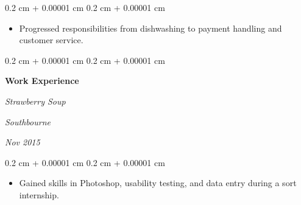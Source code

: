 \documentclass[10pt, letterpaper]{article}
\newenvironment{highlights}{
    \begin{itemize}[
        topsep=0.10 cm,
        parsep=0.10 cm,
        partopsep=0pt,
        itemsep=0pt,
        leftmargin=0.4 cm + 10pt
    ]
}{
    \end{itemize}
} %
\newenvironment{onecolentry}{
    \begin{adjustwidth}{
        0.2 cm + 0.00001 cm
    }{
        0.2 cm + 0.00001 cm
    }
}{
    \end{adjustwidth}
} %
\newenvironment{twocolentry}[2][]{
    \onecolentry
    \def\secondColumn{#2}
    \setcolumnwidth{\fill, 4.5 cm}
    \begin{paracol}{2}
}{
    \switchcolumn \raggedleft \secondColumn
    \end{paracol}
    \endonecolentry
} %
\begin{document}
        \vspace{0.10 cm}
        \begin{onecolentry}
            \begin{highlights}
                \item Progressed responsibilities from dishwashing to payment handling and customer service.
            \end{highlights}
        \end{onecolentry}


        \vspace{0.2 cm}

        \begin{twocolentry}{
        \textit{Southbourne}    
            
        \textit{Nov 2015}}
            \textbf{Work Experience}
            
            \textit{Strawberry Soup}
        \end{twocolentry}

        \vspace{0.10 cm}
        \begin{onecolentry}
            \begin{highlights}
                \item Gained skills in Photoshop, usability testing, and data entry during a sort internship.
            \end{highlights}
        \end{onecolentry}



    
\end{document}

